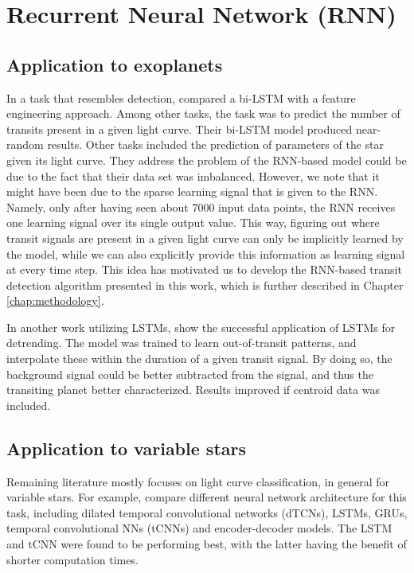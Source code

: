 
\section{Recurrent Neural Network (RNN)}
\red{[TODO]}

\subsection{Application to exoplanets}
In a task that resembles detection, \cite{hinners2018machine} compared a bi-LSTM with a feature engineering approach. Among other tasks, the task was to predict the number of transits present in a given light curve. Their bi-LSTM model produced near-random results. Other tasks included the prediction of parameters of the star given its light curve. They address the problem of the RNN-based model could be due to the fact that their data set was imbalanced. However, we note that it might have been due to the sparse learning signal that is given to the RNN. Namely, only after having seen about 7000 input data points, the RNN receives one learning signal over its single output value. This way, figuring out where transit signals are present in a given light curve can only be implicitly learned by the model, while we can also explicitly provide this information as learning signal at every time step. This idea has motivated us to develop the RNN-based transit detection algorithm presented in this work, which is further described in Chapter \ref{chap:methodology}. 

In another work utilizing LSTMs, \cite{morvan2020detrending} show the successful application of LSTMs for detrending. The model was trained to learn out-of-transit patterns, and interpolate these within the duration of a given transit signal. By doing so, the background signal could be better subtracted from the signal, and thus the transiting planet better characterized. Results improved if centroid data was included.

\subsection{Application to variable stars}
Remaining literature mostly focuses on light curve classification, in general for variable stars. For example, \cite{jamal2020neural} compare different neural network architecture for this task, including dilated temporal convolutional networks (dTCNs), LSTMs, GRUs, temporal convolutional NNs (tCNNs) and encoder-decoder models. The LSTM and tCNN were found to be performing best, with the latter having the benefit of shorter computation times. 

